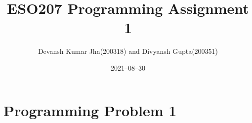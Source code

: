 \documentclass[20pt]{article}
\title{ESO207 Programming Assignment 1}
\author{Devansh Kumar Jha(200318) and Divyansh Gupta(200351)}
\date{2021–08–30}
\begin{document}
\maketitle





\section{Programming Problem 1}
\end{document}
